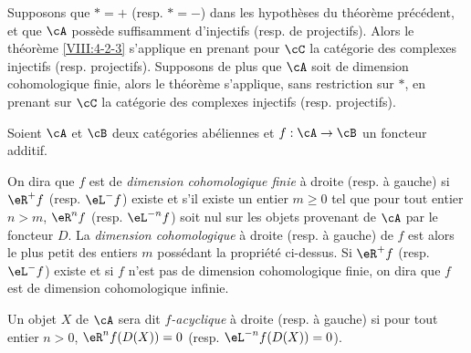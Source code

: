 \begin{corollary}\label{VIII:4-2-3-1} %
Supposons que $\ast=+$ (resp. $\ast=-$) dans les hypothèses du théorème 
précédent, et que $\cA$ possède suffisamment d'injectifs (resp. de 
projectifs). Alors le théorème \ref{VIII:4-2-3} s'applique en prenant pour 
$\cC$ la catégorie des complexes injectifs (resp. projectifs). Supposons de 
plus que $\cA$ soit de dimension cohomologique finie, alors le théorème 
s'applique, sans restriction sur $\ast$, en prenant sur $\cC$ la catégorie 
des complexes injectifs (resp. projectifs). 
\end{corollary}





\begin{definition}\label{VIII:4-2-5} %
Soient $\cA$ et $\cB$ deux catégories abéliennes et $f:\cA\to \cB$ un 
foncteur additif. 

On dira que $f$ est de \emph{dimension cohomologique finie} à droite (resp. 
à gauche) si $\eR^+ f$ (resp. $\eL^- f$) existe et s'il existe un entier 
$m\geqslant 0$ tel que pour tout entier $n>m$, $\eR^n f$ (resp. 
$\eL^{-n} f$) soit nul sur les objets provenant de $\cA$ par le foncteur $D$. 
La \emph{dimension cohomologique} à droite (resp. à gauche) de $f$ est 
alors le plus petit des entiers $m$ possédant la propriété ci-dessus. Si 
$\eR^+ f$ (resp. $\eL^- f$) existe et si $f$ n'est pas de dimension 
cohomologique finie, on dira que $f$ est de dimension cohomologique infinie. 

Un objet $X$ de $\cA$ sera dit \emph{$f$-acyclique} à droite (resp. à 
gauche) si pour tout entier $n>0$, $\eR^n f(D(X)) = 0$ (resp. 
$\eL^{-n} f(D(X))=0$). 
\end{definition}





